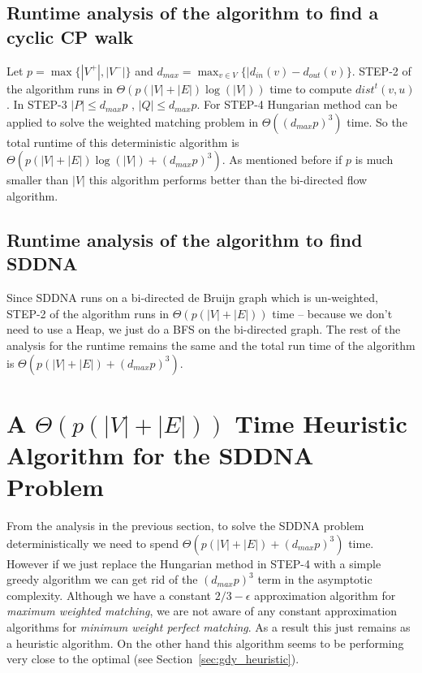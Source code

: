\documentclass[runningheads]{llncs}
\begin{document}
\subsection{Runtime analysis of the algorithm to find a cyclic CP walk}
Let $p = \max\{|V^+|, |V^-|\}$ and $d_{max} = \displaystyle\max_{v\in V}\{|d_{in}(v)-d_{out}(v)\}$.
{\sf STEP-2} of the algorithm runs in $\Theta(p(|V|+|E|)\log(|V|))$ time to compute $dist^t(v,u)$. In 
{\sf STEP-3} $|P|\leq d_{max}p$ , $|Q|\leq d_{max}p$. For {\sf STEP-4} Hungarian method can be applied
to solve the weighted matching problem in $\Theta((d_{max}p)^3)$ time. So the total runtime of this
deterministic algorithm is $\Theta(p(|V|+|E|)\log(|V|) + (d_{max}p)^3)$. As mentioned before
if $p$ is much smaller than $|V|$ this algorithm performs better than the bi-directed flow algorithm.
\subsection{Runtime analysis of the algorithm to find SDDNA}
Since SDDNA runs on a bi-directed de Bruijn graph which is un-weighted, {\sf STEP-2} of the algorithm
runs in $\Theta(p(|V|+|E|))$ time -- because we don't need to use a Heap, we just do a BFS on the bi-directed
graph. The rest of the analysis for the runtime remains the same and the total run time of the algorithm 
is $\Theta(p(|V|+|E|)+(d_{max}p)^3)$.


\section{A $\Theta(p(|V|+|E|))$ Time Heuristic Algorithm for the SDDNA Problem}
\label{sec:gdy_algo}
From the analysis in the previous section, to solve the SDDNA problem deterministically we need to spend
$\Theta(p(|V|+|E|) + (d_{max}p)^3)$ time. However if we just replace the Hungarian method in {\sf STEP-4}
with a simple greedy algorithm we can get rid of the $(d_{max}p)^3$ term in the asymptotic complexity.
Although we have a constant $2/3-\epsilon$ approximation algorithm for {\em maximum weighted matching},
we are not aware of any constant approximation algorithms for {\em minimum weight perfect matching}.
As a result this just remains as a heuristic algorithm. On the other hand this algorithm seems to be
performing very close to the optimal (see Section~\ref{sec:gdy_heuristic}).
\end{document}

